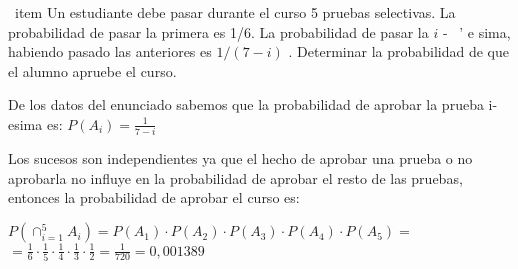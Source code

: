 \problem

\ item   Un estudiante debe pasar durante el curso 5 pruebas selectivas. La
probabilidad de pasar la primera es 1/6. La probabilidad de pasar la
$ i $ - { \ ' e} sima, habiendo pasado las anteriores es   $ 1 / ( 7 -i) $ . Determinar la
probabilidad de que el alumno apruebe el curso.

	\begin{flushleft}
		De los datos del enunciado sabemos que la probabilidad de aprobar la prueba i-esima es: $P(A_{i}) = \frac{1}{7-i}$
	\end{flushleft}

\begin{flushleft}
	Los sucesos son independientes ya que el hecho de aprobar una prueba o no aprobarla no influye en la probabilidad de aprobar el resto de las pruebas, entonces la probabilidad de aprobar el curso es: 
\end{flushleft}

$P(\cap^{5}_{i=1} A_{i}) = P(A_{1})\cdot P(A_{2})\cdot P(A_{3})\cdot P(A_{4})\cdot P(A_{5}) = $ \\ $=\frac{1}{6} \cdot \frac{1}{5} \cdot \frac{1}{4} \cdot \frac{1}{3} \cdot \frac{1}{2} = \frac{1}{720} = 0,001389$


